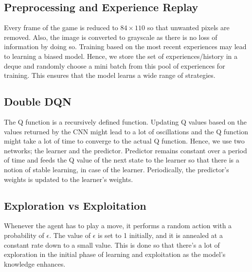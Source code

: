\documentclass[conference]{IEEEtran}
\begin{document}
\subsection{Preprocessing and Experience Replay}
Every frame of the game is reduced to $84 \times 110$ so that unwanted pixels are removed. Also, the image is converted to grayscale as there is no loss of information by doing so. Training based on the most recent experiences may lead to learning a biased model. Hence, we store the set of experiences/history in a deque and randomly choose a mini batch from this pool of experiences for training. This ensures that the model learns a wide range of strategies. 
\subsection{Double DQN}
The Q function is a recursively defined function. Updating Q values based on the values returned by the CNN might lead to a lot of oscillations and the Q function might take a lot of time to converge to the actual Q function. Hence, we use two networks; the learner and the predictor. Predictor remains constant over a period of time and feeds the Q value of the next state to the learner so that there is a notion of stable learning, in case of the learner. Periodically, the predictor's weights is updated to the learner's weights. 
\subsection{Exploration vs Exploitation}
Whenever the agent has to play a move, it performs a random action with a probability of $\epsilon$. The value of $\epsilon$ is set to 1 initially, and it is annealed at a constant rate down to a small value. This is done so that there's a lot of exploration in the initial phase of learning and exploitation as the model's knowledge enhances. 
\end{document}
